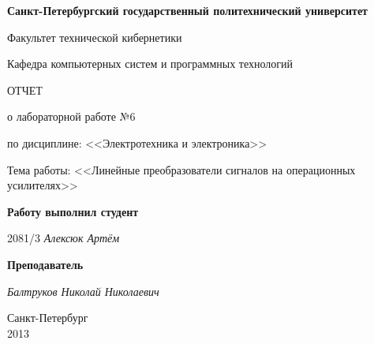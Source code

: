 \begin{titlepage}
\begin{center}

\textbf{Санкт-Петербургский государственный политехнический университет}

\vspace{5mm}
Факультет технической кибернетики

\vspace{5mm}
Кафедра компьютерных систем и программных технологий

\vspace*{\fill}

\huge{ОТЧЕТ}

\Large{о лабораторной работе №6}

\large{по дисциплине: <<Электротехника и электроника>>}

\vspace*{2mm}
\large{Тема работы: <<Линейные преобразователи сигналов на операционных усилителях>>}

\vspace*{\fill}
\end{center}

\begin{large}
\hspace{0.4\linewidth} \textbf{Работу выполнил студент}

\vspace{5mm}
\hspace{0.4\linewidth} 2081/3 \hspace{1cm} \textit{Алексюк Артём}

\vspace{3mm}
\hspace{0.4\linewidth} \textbf{Преподаватель}

\vspace{5mm}
\hspace{0.4\linewidth} \underline{\hspace{2cm} } \hspace{3mm} \textit{Балтруков Николай Николаевич}
\end{large}

\vspace*{3cm}

\begin{center}
\normalsize Санкт-Петербург\\2013
\end{center}
\end{titlepage}